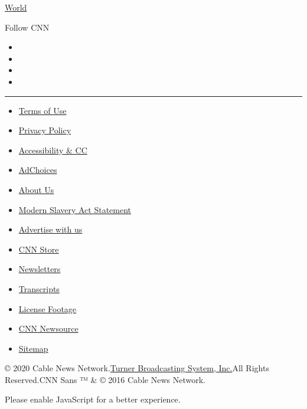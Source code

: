 \href{/world}{World}

Follow CNN

\begin{itemize}
\item
\item
\item
\item
\end{itemize}

\begin{center}\rule{0.5\linewidth}{\linethickness}\end{center}

\begin{itemize}
\tightlist
\item
  \href{/terms}{Terms of Use}
\item
  \href{/privacy}{Privacy Policy}
\item
  \href{/accessibility}{Accessibility \& CC}
\item
  \protect\hyperlink{}{AdChoices}
\item
  \href{/about}{About Us}
\item
  \href{/msa}{Modern Slavery Act Statement}
\item
  \href{https://commercial.cnn.com}{Advertise with us}
\item
  \href{//store.cnn.com}{CNN Store}
\item
  \href{/newsletters}{Newsletters}
\item
  \href{/transcripts}{Transcripts}
\item
  \href{/collection}{License Footage}
\item
  \href{http://cnnnewsource.com}{CNN Newsource}
\item
  \href{https://www.cnn.com/sitemap.html}{Sitemap}
\end{itemize}

© 2020 Cable News Network.\href{//www.turner.com}{Turner Broadcasting
System, Inc.}All Rights Reserved.CNN Sans ™ \& © 2016 Cable News
Network.

Please enable JavaScript for a better experience.
